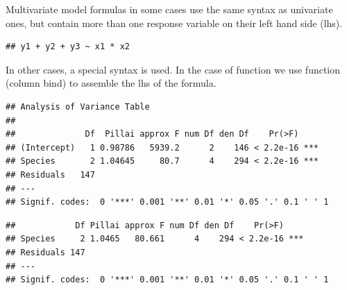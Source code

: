 \documentclass[krantz2]{krantz}\usepackage{knitr}%
\begin{document}
Multivariate model formulas in some cases use the same syntax as univariate ones, but contain more than one response variable on their left hand side (lhs).

\begin{knitrout}\footnotesize
{}\color{fgcolor}\begin{kframe}
\begin{alltt}
 \hlopt{+}  \hlopt{+}  \hlopt{~}  \hlopt{*} 
\end{alltt}
\begin{verbatim}
## y1 + y2 + y3 ~ x1 * x2
\end{verbatim}
\end{kframe}
\end{knitrout}

In other cases, a special syntax is used. In the case of function  we use function  (column bind) to assemble the lhs of the formula.

\begin{knitrout}\footnotesize
{}\color{fgcolor}\begin{kframe}
\begin{alltt}
 \hlkwb{<-} \hlstd{(} \hlopt{~}    
\end{alltt}
\begin{verbatim}
## Analysis of Variance Table
## 
##              Df  Pillai approx F num Df den Df    Pr(>F)    
## (Intercept)   1 0.98786   5939.2      2    146 < 2.2e-16 ***
## Species       2 1.04645     80.7      4    294 < 2.2e-16 ***
## Residuals   147                                             
## ---
## Signif. codes:  0 '***' 0.001 '**' 0.01 '*' 0.05 '.' 0.1 ' ' 1
\end{verbatim}
\begin{alltt}
\end{alltt}
\begin{verbatim}
##            Df Pillai approx F num Df den Df    Pr(>F)    
## Species     2 1.0465   80.661      4    294 < 2.2e-16 ***
## Residuals 147                                            
## ---
## Signif. codes:  0 '***' 0.001 '**' 0.01 '*' 0.05 '.' 0.1 ' ' 1
\end{verbatim}
\end{kframe}
\end{knitrout}
\end{document}
